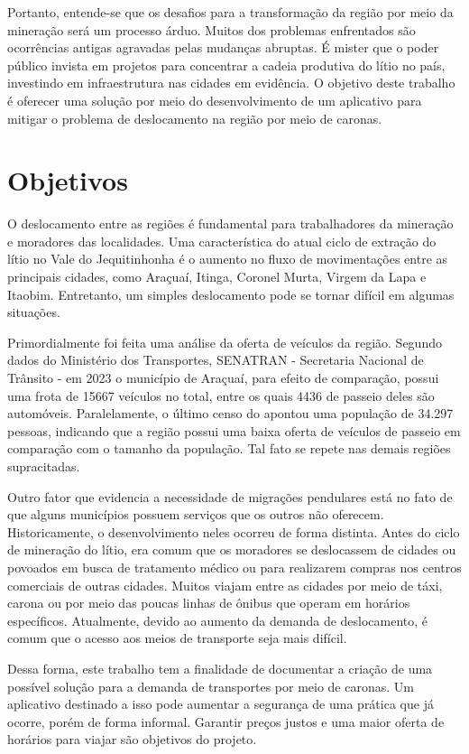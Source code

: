 Portanto, entende-se que os desafios para a transformação da região por meio da mineração será um processo árduo. Muitos dos problemas enfrentados são ocorrências antigas agravadas pelas mudanças abruptas. É mister que o poder público invista em projetos para concentrar a cadeia produtiva do lítio no país, investindo em infraestrutura nas cidades em evidência. O objetivo deste trabalho é oferecer uma solução por meio do desenvolvimento de um aplicativo para mitigar o problema de deslocamento na região por meio de caronas.


\section{Objetivos}

O deslocamento entre as regiões é fundamental para trabalhadores da mineração e moradores das localidades. Uma característica do atual ciclo de extração do lítio no Vale do Jequitinhonha é o aumento no fluxo de movimentações entre as principais cidades, como Araçuaí, Itinga, Coronel Murta, Virgem da Lapa e Itaobim. Entretanto, um simples deslocamento pode se tornar difícil em algumas situações.

Primordialmente foi feita uma análise da oferta de veículos da região. Segundo dados do Ministério dos Transportes, SENATRAN - Secretaria Nacional de Trânsito - em 2023 o município de Araçuaí, para efeito de comparação, possui uma frota de 15667 veículos no total, entre os quais 4436 de passeio deles são automóveis. Paralelamente, o último censo do  apontou uma população de 34.297 pessoas, indicando que a região possui uma baixa oferta de veículos de passeio em comparação com o tamanho da população. Tal fato se repete nas demais regiões supracitadas.

Outro fator que evidencia a necessidade de migrações pendulares está no fato de que alguns municípios possuem serviços que os outros não oferecem. Historicamente, o desenvolvimento neles ocorreu de forma distinta. Antes do ciclo de mineração do lítio, era comum que os moradores se deslocassem de cidades ou povoados em busca de tratamento médico ou para realizarem compras nos centros comerciais de outras cidades. Muitos viajam entre as cidades por meio de táxi, carona ou por meio das poucas linhas de ônibus que operam em horários específicos. Atualmente, devido ao aumento da demanda de deslocamento, é comum que o acesso aos meios de transporte seja mais difícil. 

Dessa forma, este trabalho tem a finalidade de documentar a criação de uma possível solução para a demanda de transportes por meio de caronas. Um aplicativo destinado a isso pode aumentar a segurança de uma prática que já ocorre, porém de forma informal. Garantir preços justos e uma maior oferta de horários para viajar são objetivos do projeto.

